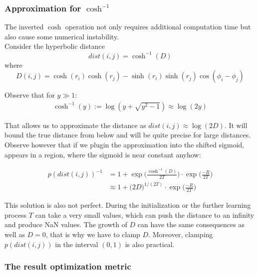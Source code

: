 \documentclass{article}
\begin{document}
\subsubsection*{Approximation for $\cosh^{-1}$}
The inverted $\cosh$ operation not only requires additional computation time but also cause some numerical instability.\\

Consider the hyperbolic distance
$$dist(i,j) = \cosh^{-1}(D)$$
where
$$ D(i,j) = \cosh(r_i) \cosh(r_j) - \sinh(r_i) \sinh(r_j) \cos(\phi_i - \phi_j)$$

Observe that for $y \gg 1$:
\begin{equation}
\begin{split}
\cosh^{-1}(y):= \log(y + \sqrt{y^2-1}) \approx \log(2y)
\end{split}
\end{equation}

That allows us to approximate the distance as $dist(i,j) \approx \log(2D)$. It will bound the true distance from below and will be quite precise for large distances. Observe however that if we plugin the approximation into the shifted sigmoid, appears in a region, where the sigmoid is near constant anyhow:

\begin{equation}
\begin{split}
p(dist(i,j))^{-1} &= 1 + \exp \bigg(\frac{\cosh^{-1}(D)}{2T}\bigg) \cdot \exp \bigg(\frac{-R}{2T}\bigg)\\
& \approx 1 + \big( 2D \big)^{1/(2T)}\cdot \exp \bigg(\frac{-R}{2T}\bigg)
\end{split}
\end{equation}

This solution is also not perfect. During the initialization or the further learning process $T$ can take a very small values, which can push the distance to an infinity and produce NaN values. The growth of $D$ can have the same consequences as well as $D=0$, that is why we have to clamp $D$. Moreover, clamping $p(dist(i,j))$ in the interval $(0,1)$ is also practical. 

\subsubsection*{The result optimization metric}
\end{document}
